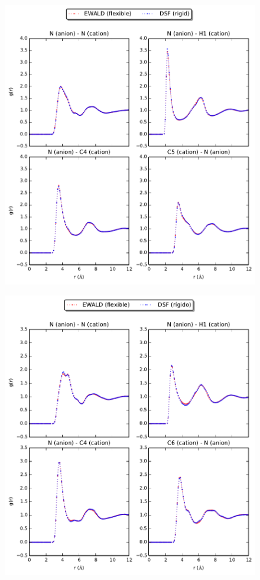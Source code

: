 \documentclass[3p,onecolumn]{elsarticle}
\begin{document}
\begin{figure}[ht]
\includegraphics[]{rdf-Batista.pdf}
\caption{\ce{[emim][B(CN)_4]}}
\label{fig:pressure}
\end{figure}


\begin{figure}[ht]
\includegraphics[]{rdf-Liu.pdf}
\caption{\ce{[emim][B(CN)_4]}}
\label{fig:pressure}
\end{figure}
\end{document}

